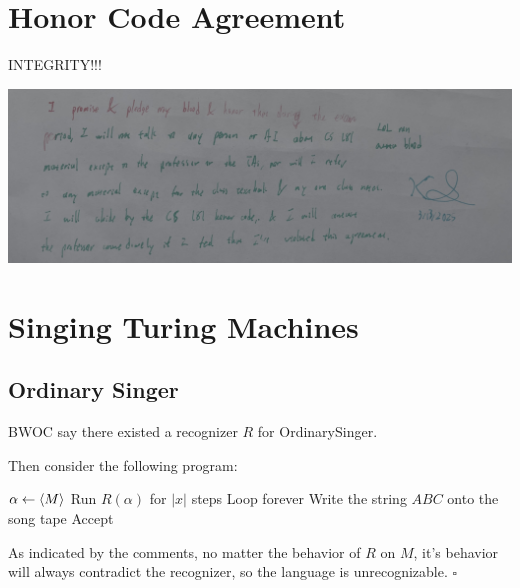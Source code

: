 \documentclass[12pt]{article}
\begin{document}
\section{Honor Code Agreement}

INTEGRITY!!!

\begin{center}
    \includegraphics[width=15cm]{honor.jpg}
\end{center}

\pagebreak

\section{Singing Turing Machines}

\subsection{Ordinary Singer}\label{sec:ordsinger}

BWOC say there existed a recognizer $R$ for OrdinarySinger.

Then consider the following program:
\begin{algorithmic}[1]
        \State $\alpha \gets \Braket{M}$
        \State Run $R(\alpha)$ for $|x|$ steps
            \State Loop forever
        \Else
            \State Write the string $ABC$ onto the song tape
            \State Accept
        \EndIf
    \EndProcedure
\end{algorithmic}
As indicated by the comments, no matter the behavior of $R$ on $M$,
it's behavior will always contradict the recognizer,
so the language is unrecognizable. $\square$
\end{document}
